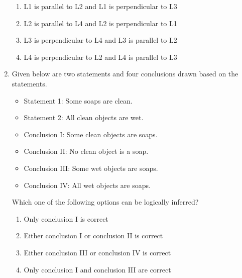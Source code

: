 \documentclass[journal,12pt,onecolumn]{IEEEtran}
\theoremstyle{remark}
\begin{document}
\begin{enumerate}
    \hfill{}
    \begin{enumerate}
        \item L1 is parallel to L2 and L1 is perpendicular to L3
        \item L2 is parallel to L4 and L2 is perpendicular to L1
        \item L3 is perpendicular to L4 and L3 is parallel to L2
        \item L4 is perpendicular to L2 and L4 is parallel to L3
    \end{enumerate}

    \item Given below are two statements and four conclusions drawn based on the statements.
    \begin{itemize}
        \item[] Statement 1: Some soaps are clean.
        \item[] Statement 2: All clean objects are wet.
    \end{itemize}
    \begin{itemize}
        \item[] Conclusion I: Some clean objects are soaps.
        \item[] Conclusion II: No clean object is a soap.
        \item[] Conclusion III: Some wet objects are soaps.
        \item[] Conclusion IV: All wet objects are soaps.
    \end{itemize}
    Which one of the following options can be logically inferred?

    \hfill{}
    \begin{enumerate}
        \item Only conclusion I is correct
        \item Either conclusion I or conclusion II is correct
        \item Either conclusion III or conclusion IV is correct
        \item Only conclusion I and conclusion III are correct
    \end{enumerate}


\end{enumerate}
\end{document}
